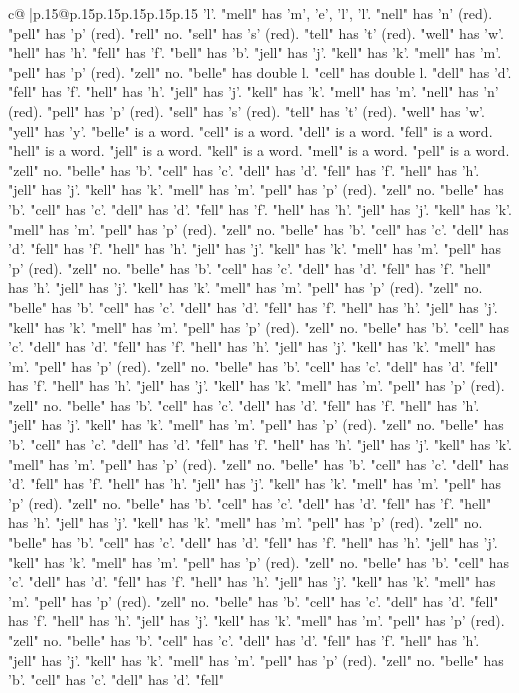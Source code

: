 \documentclass{article}
\begin{document}
{\begin{supertabular}{c@{$\;$}|p{.15\linewidth}@{}p{.15\linewidth}p{.15\linewidth}p{.15\linewidth}p{.15\linewidth}p{.15\linewidth}}
{{{'l'. "mell" has 'm', 'e', 'l', 'l'. "nell" has 'n' (red). "pell" has 'p' (red). "rell" no. "sell" has 's' (red). "tell" has 't' (red). "well" has 'w'. "hell" has 'h'. "fell" has 'f'. "bell" has 'b'. "jell" has 'j'. "kell" has 'k'. "mell" has 'm'. "pell" has 'p' (red). "zell" no. "belle" has double l. "cell" has double l. "dell" has 'd'. "fell" has 'f'. "hell" has 'h'. "jell" has 'j'. "kell" has 'k'. "mell" has 'm'. "nell" has 'n' (red). "pell" has 'p' (red). "sell" has 's' (red). "tell" has 't' (red). "well" has 'w'. "yell" has 'y'. "belle" is a word. "cell" is a word. "dell" is a word. "fell" is a word. "hell" is a word. "jell" is a word. "kell" is a word. "mell" is a word. "pell" is a word. "zell" no. "belle" has 'b'. "cell" has 'c'. "dell" has 'd'. "fell" has 'f'. "hell" has 'h'. "jell" has 'j'. "kell" has 'k'. "mell" has 'm'. "pell" has 'p' (red). "zell" no. "belle" has 'b'. "cell" has 'c'. "dell" has 'd'. "fell" has 'f'. "hell" has 'h'. "jell" has 'j'. "kell" has 'k'. "mell" has 'm'. "pell" has 'p' (red). "zell" no. "belle" has 'b'. "cell" has 'c'. "dell" has 'd'. "fell" has 'f'. "hell" has 'h'. "jell" has 'j'. "kell" has 'k'. "mell" has 'm'. "pell" has 'p' (red). "zell" no. "belle" has 'b'. "cell" has 'c'. "dell" has 'd'. "fell" has 'f'. "hell" has 'h'. "jell" has 'j'. "kell" has 'k'. "mell" has 'm'. "pell" has 'p' (red). "zell" no. "belle" has 'b'. "cell" has 'c'. "dell" has 'd'. "fell" has 'f'. "hell" has 'h'. "jell" has 'j'. "kell" has 'k'. "mell" has 'm'. "pell" has 'p' (red). "zell" no. "belle" has 'b'. "cell" has 'c'. "dell" has 'd'. "fell" has 'f'. "hell" has 'h'. "jell" has 'j'. "kell" has 'k'. "mell" has 'm'. "pell" has 'p' (red). "zell" no. "belle" has 'b'. "cell" has 'c'. "dell" has 'd'. "fell" has 'f'. "hell" has 'h'. "jell" has 'j'. "kell" has 'k'. "mell" has 'm'. "pell" has 'p' (red). "zell" no. "belle" has 'b'. "cell" has 'c'. "dell" has 'd'. "fell" has 'f'. "hell" has 'h'. "jell" has 'j'. "kell" has 'k'. "mell" has 'm'. "pell" has 'p' (red). "zell" no. "belle" has 'b'. "cell" has 'c'. "dell" has 'd'. "fell" has 'f'. "hell" has 'h'. "jell" has 'j'. "kell" has 'k'. "mell" has 'm'. "pell" has 'p' (red). "zell" no. "belle" has 'b'. "cell" has 'c'. "dell" has 'd'. "fell" has 'f'. "hell" has 'h'. "jell" has 'j'. "kell" has 'k'. "mell" has 'm'. "pell" has 'p' (red). "zell" no. "belle" has 'b'. "cell" has 'c'. "dell" has 'd'. "fell" has 'f'. "hell" has 'h'. "jell" has 'j'. "kell" has 'k'. "mell" has 'm'. "pell" has 'p' (red). "zell" no. "belle" has 'b'. "cell" has 'c'. "dell" has 'd'. "fell" has 'f'. "hell" has 'h'. "jell" has 'j'. "kell" has 'k'. "mell" has 'm'. "pell" has 'p' (red). "zell" no. "belle" has 'b'. "cell" has 'c'. "dell" has 'd'. "fell" has 'f'. "hell" has 'h'. "jell" has 'j'. "kell" has 'k'. "mell" has 'm'. "pell" has 'p' (red). "zell" no. "belle" has 'b'. "cell" has 'c'. "dell" has 'd'. "fell" has 'f'. "hell" has 'h'. "jell" has 'j'. "kell" has 'k'. "mell" has 'm'. "pell" has 'p' (red). "zell" no. "belle" has 'b'. "cell" has 'c'. "dell" has 'd'. "fell" has 'f'. "hell" has 'h'. "jell" has 'j'. "kell" has 'k'. "mell" has 'm'. "pell" has 'p' (red). "zell" no. "belle" has 'b'. "cell" has 'c'. "dell" has 'd'. "fell" }}}
\end{supertabular}}
\end{document}
